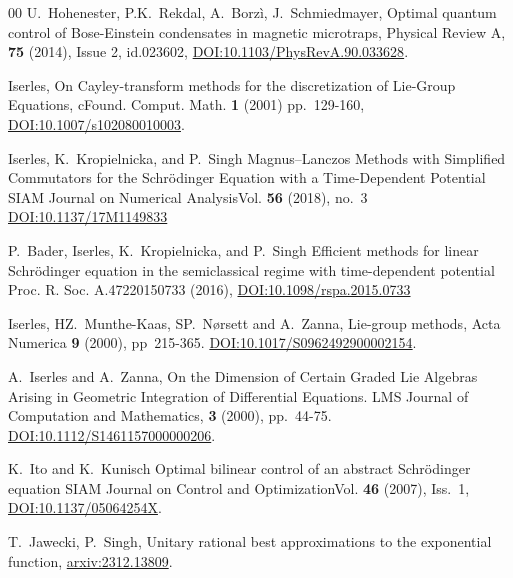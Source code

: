 \documentclass{article}
\begin{document}
\begin{thebibliography}{00}
U.~Hohenester, P.K.~Rekdal, A.~Borzì, J.~Schmiedmayer, 
\newblock Optimal quantum control of Bose-Einstein condensates in magnetic microtraps,
\newblock Physical Review A, \textbf{75} (2014), Issue 2, id.023602, \href{https://doi.org/10.1103/PhysRevA.90.033628}{DOI:10.1103/PhysRevA.90.033628}.


Iserles,
\newblock On Cayley-transform methods for the discretization of Lie-Group Equations,
c\newblock Found. Comput. Math. \textbf{1} (2001) pp.~129-160, \href{https://doi.org/10.1007/s102080010003}{DOI:10.1007/s102080010003}.


Iserles, K.~Kropielnicka, and P.~Singh
\newblock Magnus--Lanczos Methods with Simplified Commutators for the Schrödinger Equation with a Time-Dependent Potential
\newblock SIAM Journal on Numerical AnalysisVol. \textbf{56} (2018), no.~3 \href{https://doi.org/10.1137/17M1149833}{DOI:10.1137/17M1149833}


P.~Bader, Iserles, K.~Kropielnicka, and P.~Singh
\newblock Efficient methods for linear Schrödinger equation in the semiclassical regime with time-dependent potential
\newblock Proc. R. Soc. A.47220150733 (2016),
\href{http://doi.org/10.1098/rspa.2015.0733}{DOI:10.1098/rspa.2015.0733}


Iserles, HZ.~Munthe-Kaas, SP.~Nørsett and A.~Zanna,
\newblock Lie-group methods, 
\newblock Acta Numerica \textbf{9} (2000), pp~215-365. \href{http://doi.org/10.1017/S0962492900002154}{DOI:10.1017/S0962492900002154}.


A.~Iserles and A.~Zanna,
\newblock On the Dimension of Certain Graded Lie Algebras Arising in Geometric Integration of Differential Equations. 
\newblock LMS Journal of Computation and Mathematics, \textbf{3} (2000), pp.~44-75. \href{http://doi:10.1112/S1461157000000206}{DOI:10.1112/S1461157000000206}.


K.~Ito and K.~Kunisch
\newblock Optimal bilinear control of an abstract Schrödinger equation
\newblock SIAM Journal on Control and OptimizationVol. \textbf{46} (2007), Iss.~1, \href{http://doi.org/10.1137/05064254X}{DOI:10.1137/05064254X}.


T.~Jawecki, P.~Singh, 
\newblock Unitary rational best approximations to the exponential function,
\newblock \href{https://arxiv.org/pdf/2312.13809}{arxiv:2312.13809}.



\end{thebibliography}
\end{document}
